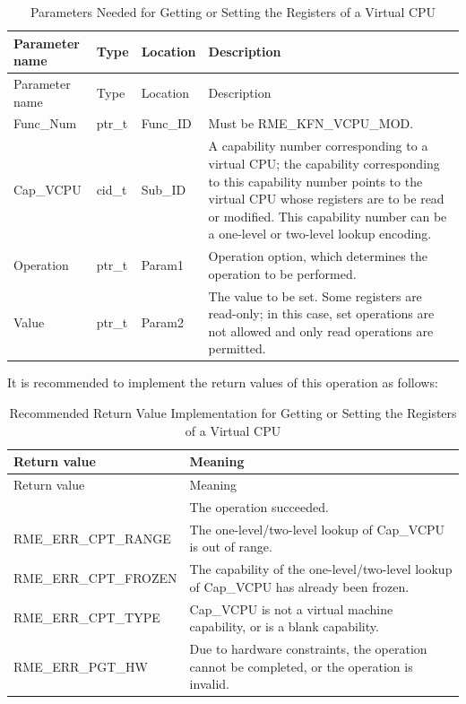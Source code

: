 \begin{xltabular}{\textwidth}{@{}>{\hsize\raggedright\arraybackslash}X>{\hsize\raggedright\arraybackslash}X>{\hsize\raggedright\arraybackslash}X>{\hsize\raggedright\arraybackslash}X@{}}
\caption{Parameters Needed for Getting or Setting the Registers of a Virtual CPU}\label{tab:8-89-get-or-set-virtual-cpu-registers-parameters}\\
\toprule
Parameter name & Type & Location & Description\tabularnewline
\endfirsthead
\toprule
Parameter name & Type & Location & Description\tabularnewline
\midrule
\endhead
\bottomrule
\endlastfoot
Func\_Num & ptr\_t & Func\_ID &
Must be RME\_KFN\_VCPU\_MOD.\tabularnewline
Cap\_VCPU & cid\_t & Sub\_ID &
A capability number corresponding to a virtual CPU; the capability corresponding to this capability number points to the virtual CPU whose registers are to be read or modified. This capability number can be a one-level or two-level lookup encoding.\tabularnewline
Operation & ptr\_t & Param1 &
Operation option, which determines the operation to be performed.\tabularnewline
Value & ptr\_t & Param2 &
The value to be set. Some registers are read-only; in this case, set operations are not allowed and only read operations are permitted.\tabularnewline
\end{xltabular}
\nopagebreak[4]

It is recommended to implement the return values of this operation as follows:

\begin{xltabular}{\textwidth}{@{}>{\hsize\raggedright\arraybackslash}X>{\hsize\raggedright\arraybackslash}X@{}}
\caption{Recommended Return Value Implementation for Getting or Setting the Registers of a Virtual CPU}\label{tab:8-90-get-or-set-virtual-cpu-registers-suggested-return-values}\\
\toprule
Return value & Meaning\tabularnewline
\endfirsthead
\toprule
Return value & Meaning\tabularnewline
\midrule
\endhead
\bottomrule
{} & The operation succeeded.\tabularnewline
    RME\_ERR\_CPT\_RANGE & The one-level/two-level lookup of Cap\_VCPU is out of range.\tabularnewline
    RME\_ERR\_CPT\_FROZEN & The capability of the one-level/two-level lookup of Cap\_VCPU has already been frozen.\tabularnewline
    RME\_ERR\_CPT\_TYPE & Cap\_VCPU is not a virtual machine capability, or is a blank capability.\tabularnewline
    
    RME\_ERR\_PGT\_HW & Due to hardware constraints, the operation cannot be completed, or the operation is invalid.\tabularnewline
\end{xltabular}
\nopagebreak[4]


